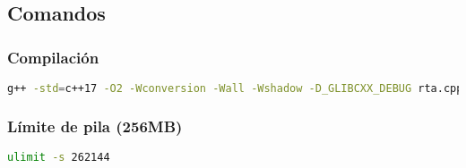 
\subsection{Comandos}

\subsubsection*{Compilación}

\begin{lstlisting}[language=bash]
g++ -std=c++17 -O2 -Wconversion -Wall -Wshadow -D_GLIBCXX_DEBUG rta.cpp -o rta 
\end{lstlisting}

\subsubsection*{Límite de pila (256MB)}

\begin{lstlisting}[language=bash]
ulimit -s 262144
\end{lstlisting}
